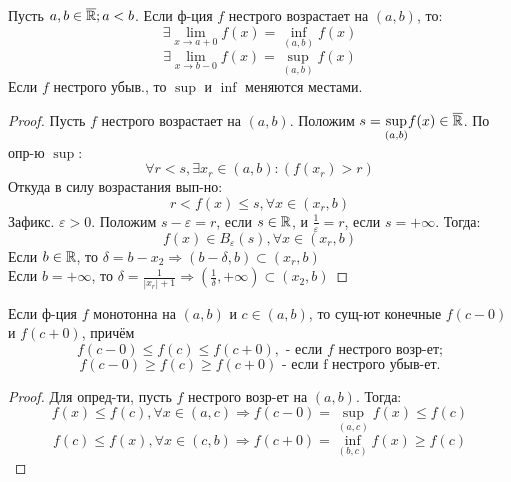 \begin{theorem}
  Пусть $a, b \in \overline{\mathbb{R}}; a < b$. Если ф-ция $f$ нестрого возрастает на $(a, b)$, то:
  \[
  \exists \lim_{x\to a + 0} f(x) = \underset{(a, b)}{\inf} f(x)
  \]
  \[
  \exists \lim_{x\to b - 0} f(x) = \underset{(a, b)}{\sup} f(x)
  \]
  Если $f$ нестрого убыв., то $\sup$ и $\inf$ меняются местами.
\end{theorem}
\begin{proof}
  Пусть $f$ нестрого возрастает на $(a, b)$. Положим $s = \underset{(a, b)}{\sup} f(x) \in \overline{\mathbb{R}}$. По опр-ю $\sup$:
  \[
  \forall r < s, \exists x_r \in (a, b) \colon (f(x_r) > r)
  \]
  Откуда в силу возрастания вып-но:
  \[
  r < f(x) \leq s, \forall x \in (x_r, b)
  \]
  Зафикс. $\varepsilon > 0$. Положим $s - \varepsilon = r$, если $s \in \mathbb{R}$, и $\frac{1}{\varepsilon} = r$, если $s = +\infty$. Тогда:
  \[
  f(x) \in B_{\varepsilon}(s), \forall x \in (x_r, b)
  \]
  Если $b \in \mathbb{R}$, то $\delta = b - x_2 \Rightarrow (b - \delta, b) \subset (x_r, b)$ \\
  
  Если $b = +\infty$, то $\delta = \frac{1}{\left|x_r\right| + 1} \Rightarrow (\frac{1}{\delta}, +\infty) \subset (x_2, b)$
\end{proof}
\begin{consequence}
Если ф-ция $f$ монотонна на $(a, b)$ и $c \in (a, b)$, то сущ-ют конечные $f(c - 0)$ и $f(c + 0)$, причём
\[
  f(c - 0) \leq f(c) \leq f(c + 0), \text{ - если $f$ нестрого возр-ет;}
\]
\[
  f(c - 0) \geq f(c) \geq f(c + 0) \text{ - если f нестрого убыв-ет.}
\]
\end{consequence}
\begin{proof}
Для опред-ти, пусть $f$ нестрого возр-ет на $(a, b)$. Тогда:
\[
f(x) \leq f(c), \forall x \in (a, c) \Rightarrow f(c - 0) = \underset{(a, c)}{\sup} f(x) \leq f(c)
\]
\[
f(c) \leq f(x), \forall x \in (c, b) \Rightarrow f(c + 0) = \underset{(b, c)}{\inf} f(x) \geq f(c)
\]
\end{proof}
